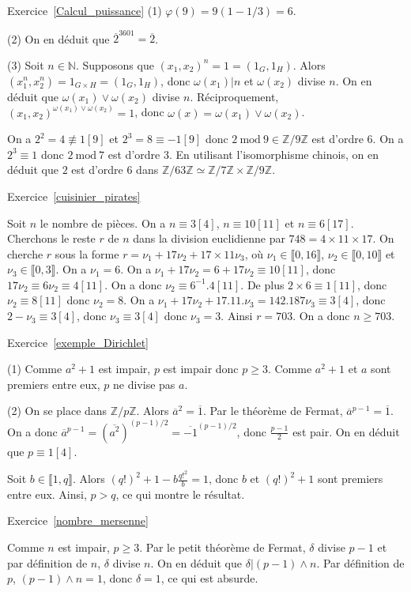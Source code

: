 \documentclass[11pt,a4paper]{article}
\newcommand{\N}{\mathbb{N}}
\newcommand{\Z}{\mathbb{Z}}
\begin{document}
Exercice~\ref{Calcul_puissance}
(1) $\varphi(9)=9(1-1/3)=6$.

(2) On en déduit que $\overline{2}^{3601}=\overline{2}$.

(3) Soit $n\in \N$. Supposons que $(x_1,x_2)^n=1=(1_G,1_H)$. Alors $(x_1^n,x_2^n)=1_{G\times H}=(1_G,1_H)$, donc $\omega(x_1)| n$ et $\omega(x_2)$ divise $n$. On en déduit que $\omega(x_1)\vee \omega(x_2)$ divise $n$. Réciproquement, $(x_1,x_2)^{\omega(x_1)\vee \omega(x_2)}=1$, donc $\omega(x)=\omega(x_1)\vee \omega(x_2)$. 

On a $2^2=4\not \equiv 1[9]$ et $2^3=8\equiv -1[9]$ donc $2\mathrm{\ mod\ }9\in \Z/9\Z$ est d'ordre $6$. On a $2^3\equiv 1$ donc $2\mathrm{\ mod\ }7$ est d'ordre $3$. En utilisant l'isomorphisme chinois, on en déduit que $2$ est d'ordre $6$ dans $\Z/63\Z\simeq \Z/7\Z\times \Z/9\Z$. 


Exercice~\ref{cuisinier_pirates}

Soit $n$ le nombre de pièces. On a $n\equiv 3[4]$, $n\equiv 10[11]$ et $n\equiv 6[17]$. Cherchons le reste $r$ de $n$ dans la division euclidienne par $748=4\times 11\times 17$. On cherche $r$ sous la forme $r=\nu_1+17\nu_2+17\times 11 \nu_3$, où $\nu_1\in \llbracket 0,16\rrbracket$, $\nu_2\in \llbracket 0,10\rrbracket$ et $\nu_3\in \llbracket 0,3\rrbracket$. On a $\nu_1=6$. On a $\nu_1+17\nu_2=6+17\nu_2\equiv 10[11]$, donc $17\nu_2\equiv 6\nu_2\equiv 4[11]$. On a donc $ \nu_2\equiv 6^{-1} .4[11]$. De plus $2\times 6\equiv 1[11]$, donc $\nu_2\equiv 8[11]$ donc $\nu_2=8$. On a $\nu_1+17\nu_2+17.11.\nu_3=142.187\nu_3\equiv 3[4]$, donc $2-\nu_3\equiv 3[4]$, donc $\nu_3\equiv 3[4]$ donc $\nu_3=3$. Ainsi $r=703$. On a donc $n\geq 703$. 


Exercice~\ref{exemple_Dirichlet}

(1) Comme $a^2+1$ est impair, $p$ est impair donc $p\geq 3$. Comme $a^2+1$ et $a$ sont premiers entre eux, $p$ ne divise pas $a$.

(2) On se place dans $\Z/p\Z$. Alors $\overline{a}^2=\overline{1}$. Par le théorème de Fermat, $\overline{a}^{p-1}=\overline{1}$. On a donc $\overline{a}^{p-1}=(\overline{a^2})^{(p-1)/2}=\overline{-1}^{(p-1)/2}$, donc $\frac{p-1}{2}$ est pair. On en déduit que $p\equiv 1[4]$.

Soit $b\in \llbracket 1,q\rrbracket$. Alors $(q!)^2+1-b \frac{q!^2}{b}=1$, donc $b$ et $(q!)^2+1$ sont premiers entre eux. Ainsi, $p>q$, ce qui montre le résultat.

Exercice~\ref{nombre_mersenne}

Comme $n$ est impair, $p\geq 3$. Par le petit théorème de Fermat, $\delta$ divise $p-1$ et par définition de $n$, $\delta$ divise $n$. On en déduit que $\delta| (p-1)\wedge n$. Par définition de $p$, $(p-1)\wedge n=1$, donc $\delta=1$, ce qui est absurde.
\end{document}
